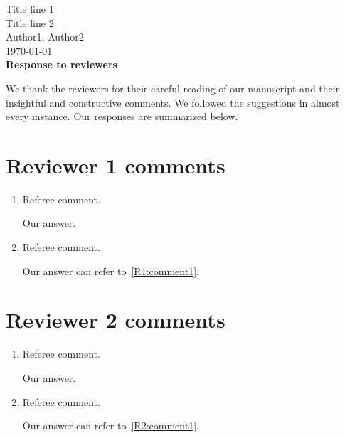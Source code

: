 \documentclass[11pt]{article}
\begin{document}
\begin{center} \Large
   Title line 1
\\ Title line 2
\\[6pt] \large Author1, Author2
\\[6pt] \today
\\[12pt]\Large \bf Response to reviewers
\end{center}

\noindent We thank the reviewers for their careful reading of our manuscript and their insightful and constructive comments. We followed the suggestions in almost every instance. Our responses are summarized below.

\section*{Reviewer 1 comments}

\begin{enumerate}[label={\color{black}R1.\arabic*}]
  \item \label{R1:comment1} Referee comment.

  \begin{answer}
    Our answer.
  \end{answer}

  \item Referee comment.

  \begin{answer}
    Our answer can refer to~\ref{R1:comment1}.
  \end{answer}
  
\end{enumerate}


\section*{Reviewer 2 comments}

\begin{enumerate}[label={\color{black}R2.\arabic*}]

  \item \label{R2:comment1} Referee comment.

  \begin{answer}
    Our answer.
  \end{answer}

  \item Referee comment.

  \begin{answer}
    Our answer can refer to~\ref{R2:comment1}.
  \end{answer}

\end{enumerate}

\frenchspacing


\end{document}
